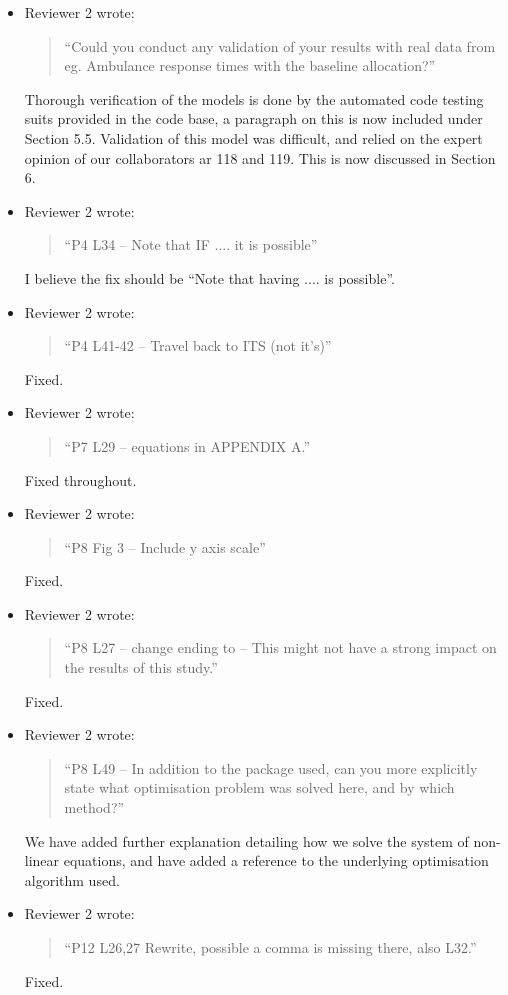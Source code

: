 \documentclass{article}
\begin{document}
\begin{itemize}
\item Reviewer 2 wrote:
\begin{quote}
``Could you conduct any validation of your results with real data from eg. Ambulance response times with the baseline allocation?''
\end{quote}
Thorough verification of the models is done by the automated code testing suits provided in the code base, a paragraph on this is now included under Section 5.5. Validation of this model was difficult, and relied on the expert opinion of our collaborators ar 118 and 119. This is now discussed in Section 6.

\item Reviewer 2 wrote:
\begin{quote}
``P4 L34 – Note that IF .... it is possible''
\end{quote}
I believe the fix should be ``Note that having .... is possible''.

\item Reviewer 2 wrote:
\begin{quote}
``P4 L41-42 – Travel back to ITS (not it’s)''
\end{quote}
Fixed.

\item Reviewer 2 wrote:
\begin{quote}
``P7 L29 – equations in APPENDIX A.''
\end{quote}
Fixed throughout.

\item Reviewer 2 wrote:
\begin{quote}
``P8 Fig 3 – Include y axis scale''
\end{quote}
Fixed.

\item Reviewer 2 wrote:
\begin{quote}
``P8 L27 – change ending to – This might not have a strong impact on the results of this study.''
\end{quote}
Fixed.

\item Reviewer 2 wrote:
\begin{quote}
``P8 L49 – In addition to the package used, can you more explicitly state what optimisation problem was solved here, and by which method?''
\end{quote}
We have added further explanation detailing how we solve the system of non-linear equations, and have added a reference to the underlying optimisation algorithm used.

\item Reviewer 2 wrote:
\begin{quote}
``P12 L26,27 Rewrite, possible a comma is missing there, also L32.''
\end{quote}
Fixed.

\end{itemize}
\end{document}
